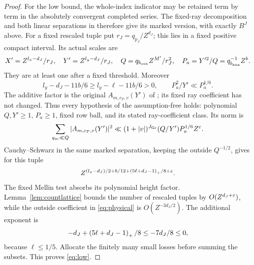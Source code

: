 \begin{proof}
For the low bound, the whole-index indicator may be retained term by term in the absolutely convergent completed series. The fixed-ray decomposition and both linear separations in  therefore give its marked version, with exactly $B^J$ above. For a fixed rescaled tuple put $r_J=q_{p_J}/Z^{d_J}$; this lies in a fixed positive compact interval. Its actual scales are
\[
 X'=Z^{l_x-d_J}/r_J,\quad Y'=Z^{l_y-d_J}/r_J,\quad
 Q=q_{b_{\rm aux}}Z^{M'}/r_J^2,\quad
 P_a=Y'^2/Q=q_{b_{\rm aux}}^{-1}Z^b.
\]
They are at least one after a fixed threshold. Moreover
\[
 l_y-d_J-11b/6\ge l_y-\ell-11b/6>0,
 \qquad P_a^2/Y'\ll P_a^{1/6}.
\]
The additive factor is the original $A_{m,c_T,v}(Y')$ of ; its fixed ray coefficient has not changed. Thus every hypothesis of the assumption-free  holds: polynomial $Q,Y'\ge1$, $P_a\ge1$, fixed row ball, and its stated ray-coefficient class. Its norm is
\[
 \sum_{q_m\ll Q}|A_{m,c_T,v}(Y')|^2
 \ll (1+|v|)^{J_{\rm Gr}}(Q/Y')P_a^{1/6}Z^\varepsilon.
\]
Cauchy--Schwarz in the same marked separation, keeping the outside $Q^{-1/2}$, gives for this tuple
\[
 Z^{(l_x-d_J)/2+b/12+\left(5\ell+d_J-1\right)_+/8+\varepsilon}.
\]
The fixed Mellin test absorbs its polynomial height factor. Lemma~\ref{lem:countlattice} bounds the number of rescaled tuples by $O(Z^{d_J+\varepsilon})$, while the outside coefficient in \eqref{eq:physical} is $O(Z^{-3d_J/2})$. The additional exponent is
\[
 -d_J+\left(5\ell+d_J-1\right)_+/8\le-7d_J/8\le0,
\]
because $\ell\le1/5$. Allocate the finitely many small losses before summing the subsets. This proves \eqref{eq:low}.
\end{proof}
